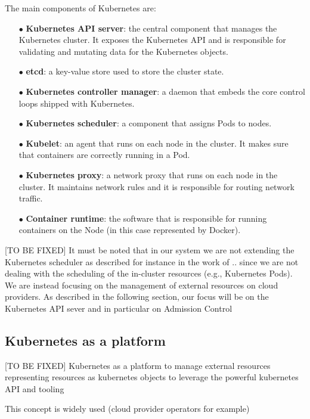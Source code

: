 The main components of Kubernetes are:
\begin{itemize}[itemsep=0.2pt, topsep=1pt]
    \item[$\bullet$] \textbf{Kubernetes API server}: the central component that manages the Kubernetes cluster. It exposes the Kubernetes API and is responsible for validating and mutating data for the Kubernetes objects.
    \item[$\bullet$] \textbf{etcd}: a key-value store used to store the cluster state.
    \item[$\bullet$] \textbf{Kubernetes controller manager}: a daemon that embeds the core control loops shipped with Kubernetes.
    \item[$\bullet$] \textbf{Kubernetes scheduler}: a component that assigns Pods to nodes.
    \item[$\bullet$] \textbf{Kubelet}: an agent that runs on each node in the cluster. It makes sure that containers are correctly running in a Pod.
    \item[$\bullet$] \textbf{Kubernetes proxy}: a network proxy that runs on each node in the cluster. It maintains network rules and it is responsible for routing network traffic.
    \item[$\bullet$] \textbf{Container runtime}: the software that is responsible for running containers on the Node (in this case represented by Docker).
\end{itemize}

[TO BE FIXED]
It must be noted that in our system we are not extending the Kubernetes scheduler as described for instance in the work of ..
since we are not dealing with the scheduling of the in-cluster resources (e.g., Kubernetes Pods). 
We are instead focusing on the management of external resources on cloud providers.
As described in the following section, our focus will be on the Kubernetes API sever and in particular on Admission Control 

\subsection{Kubernetes as a platform}

[TO BE FIXED]
Kubernetes as a platform to manage external resources
representing resources as kubernetes objects to leverage the powerful kubernetes API and tooling

This concept is widely used 
(cloud provider operators for example)

